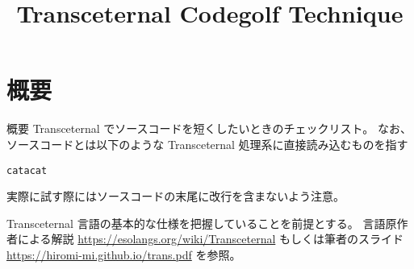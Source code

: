 \documentclass[12pt,unicode]{beamer}
\title{Transceternal Codegolf Technique}
\begin{document}
\begin{frame}
   \titlepage{}
\end{frame}

\section{概要}

\begin{frame}[fragile]{概要}
   Transceternal でソースコードを短くしたいときのチェックリスト。
   なお、ソースコードとは以下のような Transceternal 処理系に直接読み込むものを指す

\begin{verbatim}
catacat
\end{verbatim}

実際に試す際にはソースコードの末尾に改行を含まないよう注意。

Transceternal 言語の基本的な仕様を把握していることを前提とする。
言語原作者による解説 \url{https://esolangs.org/wiki/Transceternal}
もしくは筆者のスライド \url{https://hiromi-mi.github.io/trans.pdf} を参照。

\end{frame}
\end{document}
